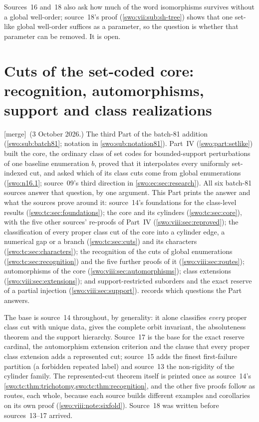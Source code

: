 \documentclass[11pt]{article}
\theoremstyle{definition}
\theoremstyle{remark}
\newcommand{\merge}{\textsf{[merge]}}
\begin{document}
Sources~16 and~18 also ask how much of the word isomorphisms survives without
a global well-order; source~18's proof (\cref{swo:vii:sub:sh-tree}) shows that
one set-like global well-order suffices as a parameter, so the question is
whether that parameter can be removed. It is open.

\part{Cuts of the set-coded core: recognition, automorphisms, support and class realizations}\label{swo:part:corecuts}

\merge\ (3 October 2026.) The third Part of the batch-81 addition
(\cref{swo:sub:batch81}; notation in \cref{swo:sub:notation81}). Part~IV
(\cref{swo:part:setlike}) built the core, the ordinary class of set codes
for bounded-support perturbations of one baseline enumeration $b$, proved
that it interpolates every uniformly set-indexed cut, and asked which of its
class cuts come from global enumerations (\cref{swo:n16.1}; source~09's
third direction in \cref{swo:ec:sec:research}). All six batch-81 sources
answer that question, by one argument. This Part prints the answer and what
the sources prove around it: source~14's foundations for the class-level
results (\cref{swo:tc:sec:foundations}); the core and its cylinders
(\cref{swo:tc:sec:core}), with the five other sources' re-proofs of
Part~IV (\cref{swo:viii:sec:reproved}); the classification of every proper
class cut of the core into a cylinder edge, a numerical gap or a branch
(\cref{swo:tc:sec:cuts}) and its characters (\cref{swo:tc:sec:characters});
the recognition of the cuts of global enumerations (\cref{swo:tc:sec:recognition})
and the five further proofs of it (\cref{swo:viii:sec:routes}); automorphisms
of the core (\cref{swo:viii:sec:automorphisms}); class extensions
(\cref{swo:viii:sec:extensions}); and support-restricted suborders and the
exact reserve of a partial injection (\cref{swo:viii:sec:support}).
 records which questions the Part answers.

The base is source~14 throughout, by generality: it alone classifies
\emph{every} proper class cut with unique data, gives the complete orbit
invariant, the absoluteness theorem and the support hierarchy. Source~17 is
the base for the exact reserve cardinal, the automorphism extension
criterion and the clause that every proper class extension adds a
represented cut; source~15 adds the finest first-failure partition (a
forbidden repeated label) and source~13 the non-rigidity of the cylinder
family. The represented-cut theorem itself is printed once as source~14's
\cref{swo:tc:thm:trichotomy,swo:tc:thm:recognition}, and the other five
proofs follow as routes, each whole, because each source builds different
examples and corollaries on its own proof (\cref{swo:viii:note:sixfold}).
Source~18 was written before sources~13--17 arrived.
\end{document}
